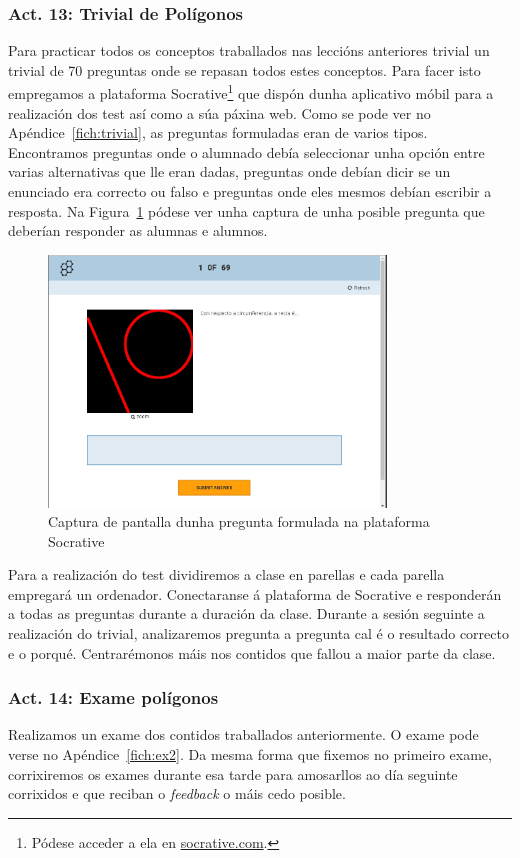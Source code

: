 \subsubsection{Act. 13: Trivial de Polígonos}\label{act13}
Para practicar todos os conceptos traballados nas leccións anteriores trivial un trivial de 70 preguntas onde se repasan todos estes conceptos. Para facer isto empregamos a plataforma Socrative\footnote{Pódese acceder a ela en \href{http://www.socrative.com/}{socrative.com}.} que dispón dunha aplicativo móbil para a realización dos test así como a súa páxina web. Como se pode ver no Apéndice~\ref{fich:trivial}, as preguntas formuladas eran de varios tipos. Encontramos preguntas onde o alumnado debía seleccionar unha opción entre varias alternativas que lle eran dadas, preguntas onde debían dicir se un enunciado era correcto ou falso e preguntas onde eles mesmos debían escribir a resposta. Na Figura~\ref{fig:act13} pódese ver unha captura de unha posible pregunta que deberían responder as alumnas e alumnos.

\begin{figure}[h!]
  \centering
  \includegraphics[width=0.8\textwidth]{img/socrative.png}
  \caption{Captura de pantalla dunha pregunta formulada na plataforma Socrative}\label{fig:act13}
\end{figure}

Para a realización do test dividiremos a clase en parellas e cada parella empregará un ordenador. Conectaranse á plataforma de Socrative e responderán a todas as preguntas durante a duración da clase. Durante a sesión seguinte a realización do trivial, analizaremos pregunta a pregunta cal é o resultado correcto e o porqué. Centrarémonos máis nos contidos que fallou a maior parte da clase.

\subsubsection{Act. 14: Exame polígonos}
Realizamos un exame dos contidos traballados anteriormente. O exame pode verse no Apéndice~\ref{fich:ex2}. Da mesma forma que fixemos no primeiro exame, corrixiremos os exames durante esa tarde para amosarllos ao día seguinte corrixidos e que reciban o \emph{feedback} o máis cedo posible.

